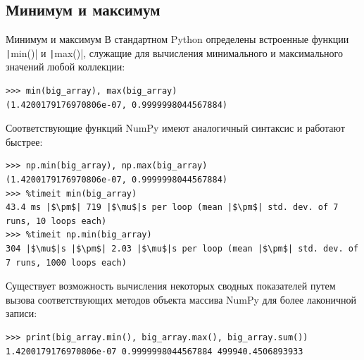 \documentclass[aspectratio=169, mathserif]{beamer}	%
\begin{document}
\subsection{Минимум и максимум}
\begin{frame}[fragile]{Минимум и максимум}
\scriptsize
В стандартном Python определены встроенные функции \texttt|min()| и \texttt|max()|, служащие для вычисления минимального и максимального значений любой коллекции:

\begin{verbatim}
>>> min(big_array), max(big_array)
(1.4200179176970806e-07, 0.9999998044567884)
\end{verbatim}

Соответствующие функций NumPy имеют аналогичный синтаксис и работают быстрее:

\begin{verbatim}
>>> np.min(big_array), np.max(big_array)
(1.4200179176970806e-07, 0.9999998044567884)
>>> %timeit min(big_array)
43.4 ms |$\pm$| 719 |$\mu$|s per loop (mean |$\pm$| std. dev. of 7 runs, 10 loops each)
>>> %timeit np.min(big_array)
304 |$\mu$|s |$\pm$| 2.03 |$\mu$|s per loop (mean |$\pm$| std. dev. of 7 runs, 1000 loops each)
\end{verbatim}

Существует возможность вычисления некоторых сводных показателей путем вызова соответствующих методов объекта массива NumPy для более лаконичной записи:

\begin{verbatim}
>>> print(big_array.min(), big_array.max(), big_array.sum())
1.4200179176970806e-07 0.9999998044567884 499940.4506893933
\end{verbatim}
\vfill
\end{frame}

\end{document}
